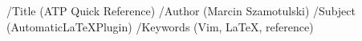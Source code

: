%



\pdfpageheight=21cm  %
\pdfpagewidth=29.7cm
\pdfinfo %
{/Title (ATP Quick Reference)
 /Author (Marcin Szamotulski)
 /Subject (AutomaticLaTeXPlugin)
 /Keywords (Vim, LaTeX, reference)}
\def\bluelink#1#2{%
\leavevmode%
\textcolor{blue2}{\tenbf\begingroup\pdfstartlink%
attr{/BS<</Type/Border/S/S/W 1>>/C [1 1 1]}%
user{/Subtype/Link/A<</Type/Action/S/URI/URI(#1)>>}%
\ignorespaces#2%
\pdfendlink\endgroup}%
}


